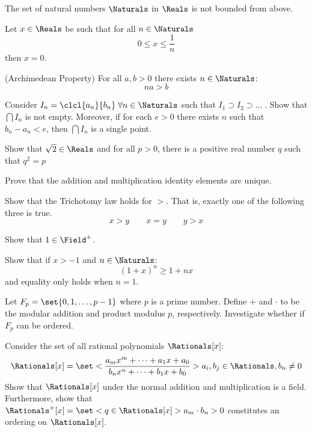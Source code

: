 \begin{exercise}
        \item The set of natural numbers \(\Naturals\) in \(\Reals\) is not bounded from above.
        \item Let \(x \in \Reals\) be such that for all \(n \in \Naturals\)
              \begin{equation*}  0\leq x \leq \dfrac{1}{n} \end{equation*}
              then \(x = 0\).
        \item (Archimedean Property) For all \(a,b > 0\) there exists \(n \in \Naturals\):
              \begin{equation*}  na > b \end{equation*}
        \item Consider \(I_n = \clcl{a_n}{b_n} \;\forall n \in \Naturals \) such that \(I_1 \supset I_2 \supset \dots\;\). Show that \(\bigcap{I_n}\) is not empty. Moreover, if for each \(e > 0\) there exists \( n\) such that \(b_n - a_n < e\), then \(\bigcap{I_n}\) is a single point.
        \item Show that \(\sqrt{2} \in \Reals\) and for all \(p > 0\), there is a positive real number \(q \) such that \(q^2 = p\)
    \item Prove that the addition and multiplication identity elements are unique.
    \item Show that the Trichotomy law holds for \(>\). That is, exactly one of the following three is true.
          \begin{equation*}  x > y \qquad x = y \qquad y > x \end{equation*}
    \item Show that \(1 \in \Field^+\).
    \item Show that if \(x > -1\) and \(n \in \Naturals\):
          \begin{equation*} (1 + x)^n \geq 1 + nx \end{equation*}
          and equality only holds when \(n = 1\).
    \item Let \(F_p = \set{ 0, 1, \dots, p -1 }\) where \(p\) is a prime number. Define \(+\) and \(\cdot\) to be the modular addition and product modulus \(p\), respectively. Investigate whether if \(F_p\) can be ordered.
    \item Consider the set of all rational polynomials \(\Rationals[x]\):
          \begin{equation*} \Rationals[x] = \set< \frac{a_m x^m + \dots + a_1 x + a_0}{b_n x^n + \dots + b_1 x + b_0}>{ a_i, b_j \in \Rationals, b_n \neq 0} \end{equation*}
          Show that \(\Rationals[x]\) under the normal addition and multiplication is a field. Furthermore, show that \(\Rationals^+[x] = \set< q \in \Rationals[x] >{ a_m \cdot b_n > 0 }\) constitutes an ordering on \(\Rationals[x]\).
\end{exercise}

